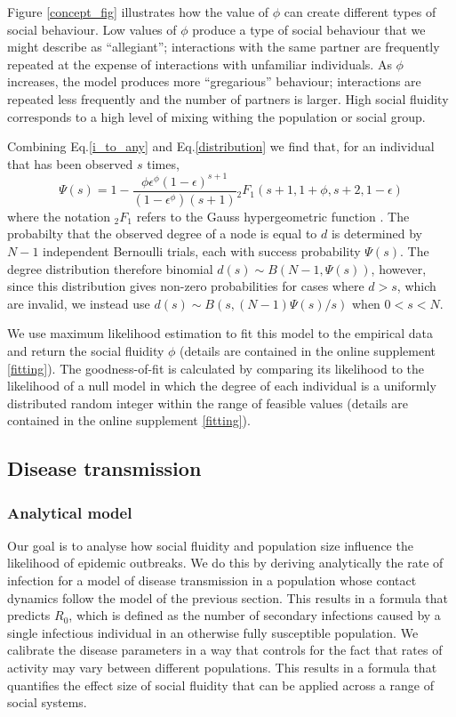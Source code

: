 \documentclass[10pt]{article}
\begin{document}
\begin{multicols}{2}
Figure \ref{concept_fig} illustrates how the value of $\phi$ can create different types of social behaviour. Low values of $\phi$ produce a type of social behaviour that we might describe as ``allegiant''; interactions with the same partner are frequently repeated at the expense of interactions with unfamiliar individuals. As $\phi$ increases, the model produces more ``gregarious'' behaviour; interactions are repeated less frequently and the number of partners is larger. High social fluidity corresponds to a high level of mixing withing the population or social group.

Combining Eq.\eqref{i_to_any} and Eq.\eqref{distribution} we find that, for an individual that has been observed $s$ times,
\begin{equation}
\label{hyper_solution}
\Psi(s)=1-\frac{\phi\epsilon^{\phi}(1-\epsilon)^{s+1}}{(1-\epsilon^{\phi})(s+1)}{}_{2}F_{1}(s+1, 1+\phi, s+2, 1-\epsilon)
\end{equation}
where the notation ${}_{2}F_{1}$ refers to the Gauss hypergeometric function \cite{absteg}. The probabilty that the observed degree of a node is equal to $d$ is determined by $N-1$ independent Bernoulli trials, each with success probability $\Psi(s)$. The degree distribution therefore binomial $d(s)\sim B(N-1,\Psi(s))$, however, since this distribution gives non-zero probabilities for cases where $d>s$, which are invalid, we instead use $d(s)\sim B(s,(N-1)\Psi(s)/s)$ when $0<s<N$.

We use maximum likelihood estimation to fit this model to the empirical data and return the social fluidity $\phi$ (details are contained in the online supplement \ref{fitting}). The goodness-of-fit is calculated by comparing its likelihood to the likelihood of a null model in which the degree of each individual is a uniformly distributed random integer within the range of feasible values (details are contained in the online supplement \ref{fitting}).

\subsection{Disease transmission}
\subsubsection{Analytical model}
\label{disease_section}
Our goal is to analyse how social fluidity and population size influence the likelihood of epidemic outbreaks. We do this by deriving analytically the rate of infection for a model of disease transmission in a population whose contact dynamics follow the model of the previous section. This results in a formula that predicts $R_{0}$, which is defined as the number of secondary infections caused by a single infectious individual in an otherwise fully susceptible population. We calibrate the disease parameters in a way that controls for the fact that rates of activity may vary between different populations. This results in a formula that quantifies the effect size of social fluidity that can be applied across a range of social systems. 


\end{multicols}
\end{document}
